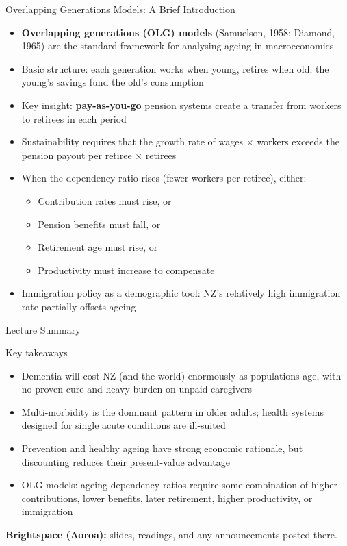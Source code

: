 \documentclass[aspectratio=169, 12pt]{beamer}
\newcommand{\summaryside}[1]{%
  \begin{frame}{Lecture Summary}
    \begin{exampleblock}{Key takeaways}
      \begin{itemize}#1\end{itemize}
    \end{exampleblock}
    \vspace{0.5em}
    {\footnotesize\textcolor{OtagoGold}{\textbf{Brightspace (Aoroa):}} slides, readings, and any announcements posted there.}
  \end{frame}}
\begin{document}
\begin{frame}{Overlapping Generations Models: A Brief Introduction}
  \begin{itemize}
    \item \textbf{Overlapping generations (OLG) models} (Samuelson, 1958; Diamond, 1965) are
          the standard framework for analysing ageing in macroeconomics
    \item Basic structure: each generation works when young, retires when old; the young's
          savings fund the old's consumption
    \item Key insight: \textbf{pay-as-you-go} pension systems create a transfer from workers
          to retirees in each period
    \item Sustainability requires that the growth rate of wages $\times$ workers exceeds
          the pension payout per retiree $\times$ retirees
    \item When the dependency ratio rises (fewer workers per retiree), either:
    \begin{itemize}
      \item Contribution rates must rise, or
      \item Pension benefits must fall, or
      \item Retirement age must rise, or
      \item Productivity must increase to compensate
    \end{itemize}
    \item Immigration policy as a demographic tool: NZ's relatively high immigration
          rate partially offsets ageing
  \end{itemize}
\end{frame}

\summaryside{
  \item Dementia will cost NZ (and the world) enormously as populations age, with no proven cure and heavy burden on unpaid caregivers
  \item Multi-morbidity is the dominant pattern in older adults; health systems designed for single acute conditions are ill-suited
  \item Prevention and healthy ageing have strong economic rationale, but discounting reduces their present-value advantage
  \item OLG models: ageing dependency ratios require some combination of higher contributions, lower benefits, later retirement, higher productivity, or immigration
}


\end{document}
